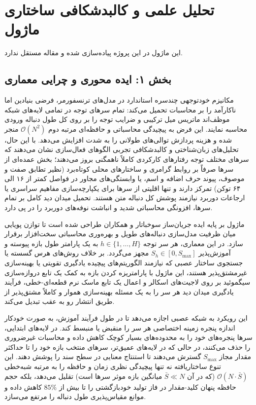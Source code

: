 \section{تحلیل علمی و کالبدشکافی ساختاری ماژول }

این ماژول در این پروژه پیاده‌سازی شده و مقاله مستقل ندارد.
\label{sec:adaptive_span_attention}

\subsection*{بخش ۱: ایده محوری و چرایی معماری }
مکانیزم خودتوجهی چندسره استاندارد  در مدل‌های ترنسفورمر، فرضی بنیادین اما ناکارآمد را بر محاسبات تحمیل می‌کند: تمام سرهای توجه در تمامی لایه‌های شبکه موظف‌اند ماتریس میل ترکیبی و ضرایب توجه را بر روی کل طول دنباله ورودی  محاسبه نمایند. این فرض به پیچیدگی محاسباتی و حافظه‌ای مرتبه دوم $\mathcal{O}(N^2)$ منجر شده و هزینه پردازش توالی‌های طولانی را به شدت افزایش می‌دهد. با این حال، تحلیل‌های زبان‌شناختی و کالبدشکافی تجربی الگوهای فعال‌سازی نشان می‌دهند که سرهای مختلف توجه رفتارهای کارکردی کاملاً ناهمگنی بروز می‌دهند؛ بخش عمده‌ای از سرها صرفاً بر روابط گرامری و ساختارهای محلی کوتاه‌برد (نظیر تطابق صفت و موصوف، پیوند حرف اضافه و اسم، یا وابستگی‌های مجاور در فواصل کمتر از ۱۶ الی ۶۴ توکن) تمرکز دارند و تنها اقلیتی از سرها برای یکپارچه‌سازی مفاهیم سراسری یا ارجاعات دوربرد نیازمند پوشش کل دنباله متن هستند. تحمیل میدان دید کامل  بر تمام سرها، افزونگی محاسباتی شدید و انباشت نوفه‌های دوربرد را در پی دارد.

ماژول  بر پایه ایده جریان‌ساز سوخباتار و همکاران  طراحی شده است تا توازن پویایی میان ظرفیت مدل‌سازی دنباله‌های طویل و بهره‌وری محاسباتی سخت‌افزار برقرار سازد. در این معماری، هر سر توجه $h \in \{1, \dots, H\}$ به یک پارامتر طول بازه پیوسته و آموزش‌پذیر $S_h \in [0, S_{\max}]$ مجهز می‌گردد. بر خلاف روش‌های هرس گسسته یا جستجوی ساختار عصبی  که نیازمند الگوریتم‌های پیچیده یادگیری تقویتی یا بهینه‌سازی غیرمشتق‌پذیر هستند، این ماژول با پارامتریزه کردن بازه به کمک یک تابع دروازه‌سازی سیگموئید بر روی لاجیت‌های اسکالر و اعمال یک تابع ماسک نرم قطعه‌ای-خطی، فرآیند یادگیری میدان دید هر سر را به یک مسئله بهینه‌سازی هموار و کاملاً مشتق‌پذیر از طریق انتشار رو به عقب  تبدیل می‌کند.

این رویکرد به شبکه عصبی اجازه می‌دهد تا در طول فرآیند آموزش، به صورت خودکار اندازه پنجره زمینه اختصاصی هر سر را منقبض یا منبسط کند. در لایه‌های ابتدایی، سرها پنجره‌های خود را به محدوده‌های بسیار کوچک کاهش داده و محاسبات غیرضروری را حذف می‌کنند، در حالی که در لایه‌های عمیق‌تر، سرهای منتخب بازه خود را تا حداکثر مقدار مجاز $S_{\max}$ گسترش می‌دهند تا استنتاج معنایی در سطح سند را پوشش دهند. این تنوع ساختاریافته نه تنها پیچیدگی نظری زمان و حافظه را به مرتبه شبه‌خطی $\mathcal{O}(N \cdot \bar{S})$ (که در آن $\bar{S} \ll N$ میانگین بازه موثر سرها است) تقلیل می‌دهد، بلکه حجم حافظه پنهان کلید-مقدار  در فاز تولید خودبازگشتی را تا بیش از $85\%$ کاهش داده و موانع مقیاس‌پذیری طول دنباله را مرتفع می‌سازد.

